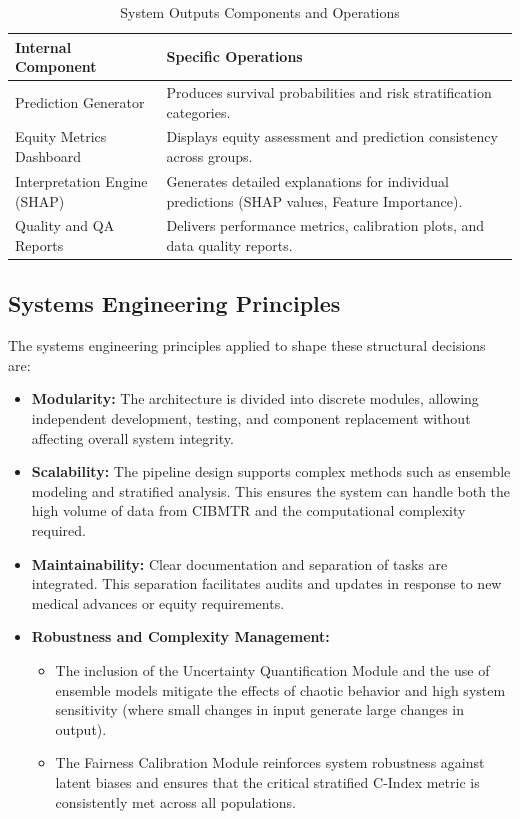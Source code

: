 \begin{table}[H]
\centering
\begin{tabular}{|p{5cm}|p{9cm}|}
\hline
\textbf{Internal Component} & \textbf{Specific Operations} \\
\hline
Prediction Generator & Produces survival probabilities and risk stratification categories. \\
\hline
Equity Metrics Dashboard & Displays equity assessment and prediction consistency across groups. \\
\hline
Interpretation Engine (SHAP) & Generates detailed explanations for individual predictions (SHAP values, Feature Importance). \\
\hline
Quality and QA Reports & Delivers performance metrics, calibration plots, and data quality reports. \\
\hline
\end{tabular}
\caption{System Outputs Components and Operations}
\label{tab:outputs_module}
\end{table}

\subsection{Systems Engineering Principles}

The systems engineering principles applied to shape these structural decisions are:

\begin{itemize}
    \item \textbf{Modularity:} The architecture is divided into discrete modules, allowing independent development, testing, and component replacement without affecting overall system integrity.
    
    \item \textbf{Scalability:} The pipeline design supports complex methods such as ensemble modeling and stratified analysis. This ensures the system can handle both the high volume of data from CIBMTR and the computational complexity required.
    
    \item \textbf{Maintainability:} Clear documentation and separation of tasks are integrated. This separation facilitates audits and updates in response to new medical advances or equity requirements.
    
    \item \textbf{Robustness and Complexity Management:} 
    \begin{itemize}
        \item The inclusion of the Uncertainty Quantification Module and the use of ensemble models mitigate the effects of chaotic behavior and high system sensitivity (where small changes in input generate large changes in output).
        \item The Fairness Calibration Module reinforces system robustness against latent biases and ensures that the critical stratified C-Index metric is consistently met across all populations.
    \end{itemize}
\end{itemize}

